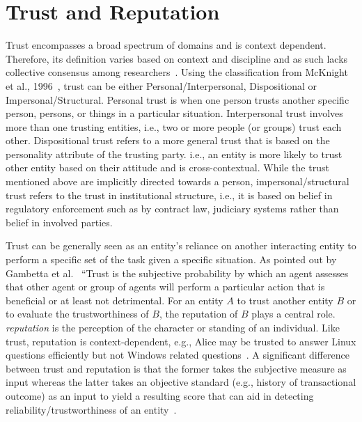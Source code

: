 \section{Trust and Reputation}
Trust encompasses a broad spectrum of domains and is context dependent.
Therefore, its definition varies based on context and discipline and as such
lacks collective consensus among researchers~\cite{mcknight1996meanings}.
Using the classification from McKnight et al., 1996~\cite{mcknight2001trust},
trust can be either Personal/Interpersonal, Dispositional or
Impersonal/Structural. Personal trust is when one person trusts another
specific person, persons, or things in a particular situation. Interpersonal
trust involves more than one trusting entities, i.e., two or more people (or
groups) trust each other. Dispositional trust refers to a more general trust
that is based on the personality attribute of the trusting party. i.e., an
entity is more likely to trust other entity based on their attitude and is
cross-contextual. While the trust mentioned above are implicitly directed
towards a person, impersonal/structural trust refers to the trust in
institutional structure, i.e., it is based on belief in regulatory enforcement
such as by contract law, judiciary systems rather than belief in involved
parties. \par

Trust can be generally seen as an entity's reliance on another interacting
entity to perform a specific set of the task given a specific situation. As
pointed out by Gambetta et al.~\cite{gambetta2000can} ``Trust is the subjective
probability by which an agent assesses that other agent or group of agents will
perform a particular action that is beneficial or at least not detrimental. For
an entity $A$ to trust another entity $B$ or to evaluate the trustworthiness of
$B$, the reputation of $B$ plays a central role. \textit{reputation} is the
perception of the character or standing of an individual. Like trust,
reputation is context-dependent, e.g., Alice may be trusted to answer Linux
questions efficiently but not Windows related
questions~\cite{zacharia2000collaborative}. A significant difference between
trust and reputation is that the former takes the subjective measure as input
whereas the latter takes an objective standard (e.g., history of transactional
outcome) as an input to yield a resulting score that can aid in detecting
reliability/trustworthiness of an
entity~\cite{Sabater2005,castelfranchi2000trust}.\par

